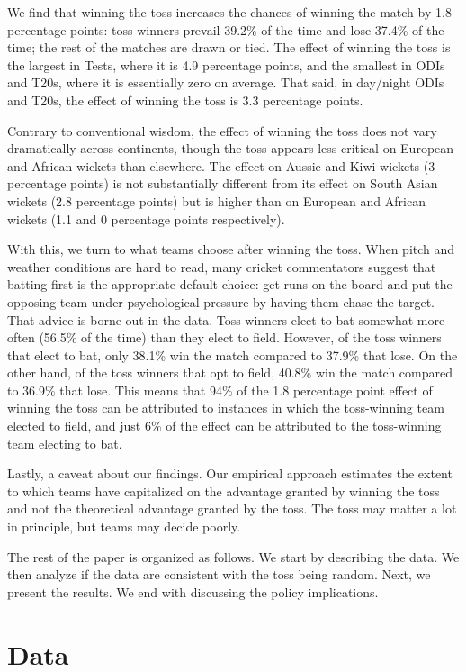 \documentclass[12pt, letterpaper]{article}
\begin{document}
We find that winning the toss increases the chances of winning the match by 1.8 percentage points: toss winners prevail 39.2\% of the time and lose 37.4\% of the time; the rest of the matches are drawn or tied. The effect of winning the toss is the largest in Tests, where it is 4.9 percentage points, and the smallest in ODIs and T20s, where it is essentially zero on average. That said, in day/night ODIs and T20s, the effect of winning the toss is 3.3 percentage points.

Contrary to conventional wisdom, the effect of winning the toss does not vary dramatically across continents, though the toss appears less critical on European and African wickets than elsewhere. The effect on Aussie and Kiwi wickets (3 percentage points) is not substantially different from its effect on South Asian wickets (2.8 percentage points) but is higher than on European and African wickets (1.1 and 0 percentage points respectively).

With this, we turn to what teams choose after winning the toss. When pitch and weather conditions are hard to read, many cricket commentators suggest that batting first is the appropriate default choice: get runs on the board and put the opposing team under psychological pressure by having them chase the target. That advice is borne out in the data. Toss winners elect to bat somewhat more often (56.5\% of the time) than they elect to field. However, of the toss winners that elect to bat, only 38.1\% win the match compared to 37.9\% that lose. On the other hand, of the toss winners that opt to field, 40.8\% win the match compared to 36.9\% that lose. This means that 94\% of the 1.8 percentage point effect of winning the toss can be attributed to instances in which the toss-winning team elected to field, and just 6\% of the effect can be attributed to the toss-winning team electing to bat.

Lastly, a caveat about our findings. Our empirical approach estimates the extent to which teams have capitalized on the advantage granted by winning the toss and not the theoretical advantage granted by the toss. The toss may matter a lot in principle, but teams may decide poorly.

The rest of the paper is organized as follows. We start by describing the data. We then analyze if the data are consistent with the toss being random. Next, we present the results. We end with discussing the policy implications.

\section{Data}
\end{document}
